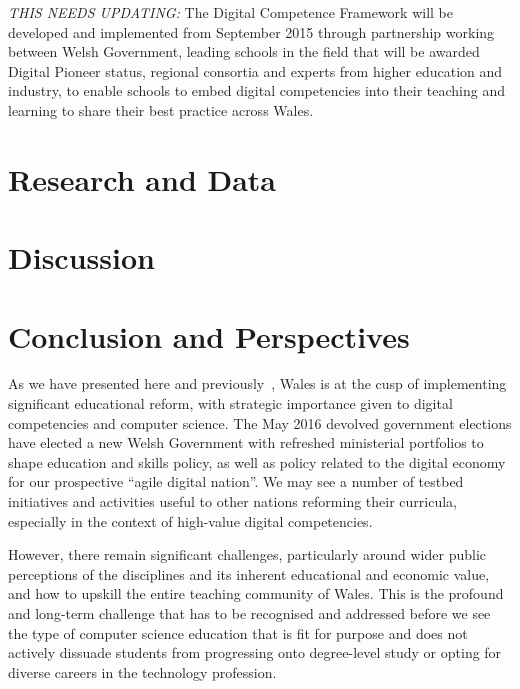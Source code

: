 {\emph{THIS NEEDS UPDATING:}} The Digital Competence Framework will be
developed and implemented from September 2015 through partnership
working between Welsh Government, leading schools in the field that
will be awarded Digital Pioneer status, regional consortia and experts
from higher education and industry, to enable schools to embed digital
competencies into their teaching and learning to share their best
practice across Wales.

\section{Research and Data}

\section{Discussion}

\section{Conclusion and Perspectives}

As we have presented here and
previously~\cite{crick+moller-wipsce2015}, Wales is at the cusp of
implementing significant educational reform, with strategic importance
given to digital competencies and computer science. The May 2016
devolved government elections have elected a new Welsh Government with
refreshed ministerial portfolios to shape education and skills policy,
as well as policy related to the digital economy for our prospective
``agile digital nation''.  We may see a number of testbed initiatives
and activities useful to other nations reforming their curricula,
especially in the context of high-value digital competencies.

However, there remain significant challenges, particularly around
wider public perceptions of the disciplines and its inherent
educational and economic value, and how to upskill the entire teaching
community of Wales. This is the profound and long-term challenge that
has to be recognised and addressed before we see the type of computer
science education that is fit for purpose and does not actively
dissuade students from progressing onto degree-level study or opting
for diverse careers in the technology profession.

